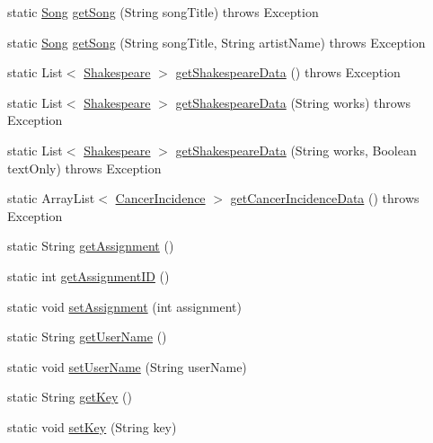 \begin{DoxyCompactItemize}
\item 
static \mbox{\hyperlink{classbridges_1_1data__src__dependent_1_1_song}{Song}} \mbox{\hyperlink{classbridges_1_1connect_1_1_bridges_a7f65e6648f9e66a02343a39f2fc425cb}{get\+Song}} (String song\+Title)  throws Exception 
\item 
static \mbox{\hyperlink{classbridges_1_1data__src__dependent_1_1_song}{Song}} \mbox{\hyperlink{classbridges_1_1connect_1_1_bridges_ae7621c3cfd9978aa02fe243317cf0cca}{get\+Song}} (String song\+Title, String artist\+Name)  throws Exception 
\item 
static List$<$ \mbox{\hyperlink{classbridges_1_1data__src__dependent_1_1_shakespeare}{Shakespeare}} $>$ \mbox{\hyperlink{classbridges_1_1connect_1_1_bridges_adc8d19f28677afb03db53736455de2d0}{get\+Shakespeare\+Data}} ()  throws Exception 
\item 
static List$<$ \mbox{\hyperlink{classbridges_1_1data__src__dependent_1_1_shakespeare}{Shakespeare}} $>$ \mbox{\hyperlink{classbridges_1_1connect_1_1_bridges_a53ac587893826c57644f2e03b33ae455}{get\+Shakespeare\+Data}} (String works)  throws Exception 
\item 
static List$<$ \mbox{\hyperlink{classbridges_1_1data__src__dependent_1_1_shakespeare}{Shakespeare}} $>$ \mbox{\hyperlink{classbridges_1_1connect_1_1_bridges_aa81c312e631bc76fa49e0ccae66679dc}{get\+Shakespeare\+Data}} (String works, Boolean text\+Only)  throws Exception 
\item 
static Array\+List$<$ \mbox{\hyperlink{classbridges_1_1data__src__dependent_1_1_cancer_incidence}{Cancer\+Incidence}} $>$ \mbox{\hyperlink{classbridges_1_1connect_1_1_bridges_ad3d3afcf9df9e2b87d069bc050029628}{get\+Cancer\+Incidence\+Data}} ()  throws Exception 
\item 
static String \mbox{\hyperlink{classbridges_1_1connect_1_1_bridges_af049c06c532987eb616156fb16ea2f43}{get\+Assignment}} ()
\item 
static int \mbox{\hyperlink{classbridges_1_1connect_1_1_bridges_ac13ed456687540b57c138adb11735d95}{get\+Assignment\+ID}} ()
\item 
static void \mbox{\hyperlink{classbridges_1_1connect_1_1_bridges_ad56c9d138965c41947bb51fe056c1cc9}{set\+Assignment}} (int assignment)
\item 
static String \mbox{\hyperlink{classbridges_1_1connect_1_1_bridges_a75f047cda3100e0cfa88378293c12961}{get\+User\+Name}} ()
\item 
static void \mbox{\hyperlink{classbridges_1_1connect_1_1_bridges_af9b9a2ca03ba02c0c2be4716594678a6}{set\+User\+Name}} (String user\+Name)
\item 
static String \mbox{\hyperlink{classbridges_1_1connect_1_1_bridges_a426897d6e5449601bb4e20c32b8346f5}{get\+Key}} ()
\item 
static void \mbox{\hyperlink{classbridges_1_1connect_1_1_bridges_ab69e89ec7d2e674a8b8c4b0be0c63397}{set\+Key}} (String key)
\end{DoxyCompactItemize}


